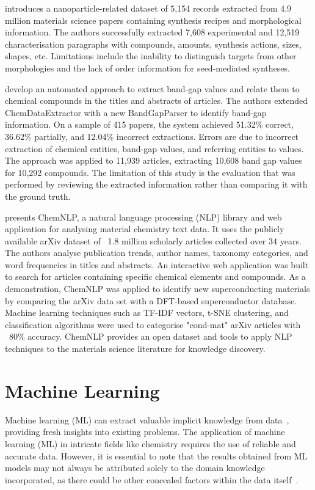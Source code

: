 \cite{cruse2022text} introduces a nanoparticle-related dataset of 5,154 records extracted from 4.9 million materials science papers containing synthesis recipes and morphological information.
The authors successfully extracted 7,608 experimental and 12,519 characterisation paragraphs with compounds, amounts, synthesis actions, sizes, shapes, etc.
Limitations include the inability to distinguish targets from other morphologies and the lack of order information for seed-mediated syntheses.

\cite{ghosh2022band} develop an automated approach to extract band-gap values and relate them to chemical compounds in the titles and abstracts of articles.
The authors extended ChemDataExtractor with a new BandGapParser to identify band-gap information.
On a sample of 415 papers, the system achieved 51.32\% correct, 36.62\% partially, and 12.04\% incorrect extractions.
Errors are due to incorrect extraction of chemical entities, band-gap values, and referring entities to values.
The approach was applied to 11,939 articles, extracting 10,608 band gap values for 10,292 compounds.
The limitation of this study is the evaluation that was performed by reviewing the extracted information rather than comparing it with the ground truth.

\cite{choudhary2023chemnlp} presents ChemNLP, a natural language processing (NLP) library and web application for analysing material chemistry text data.
It uses the publicly available arXiv dataset of ~1.8 million scholarly articles collected over 34 years.
The authors analyse publication trends, author names, taxonomy categories, and word frequencies in titles and abstracts.
An interactive web application was built to search for articles containing specific chemical elements and compounds.
As a demonstration, ChemNLP was applied to identify new superconducting materials by comparing the arXiv data set with a DFT-based superconductor database.
Machine learning techniques such as TF-IDF vectors, t-SNE clustering, and classification algorithms were used to categorise "cond-mat" arXiv articles with ~80\% accuracy.
ChemNLP provides an open dataset and tools to apply NLP techniques to the materials science literature for knowledge discovery.

\section{Machine Learning}

Machine learning (ML) can extract valuable implicit knowledge from data~\cite{keith2021combining}, providing fresh insights into existing problems.
The application of machine learning (ML) in intricate fields like chemistry requires the use of reliable and accurate data. 
However, it is essential to note that the results obtained from ML models may not always be attributed solely to the domain knowledge incorporated, as there could be other concealed factors within the data itself~\cite{keith2021combining}.

